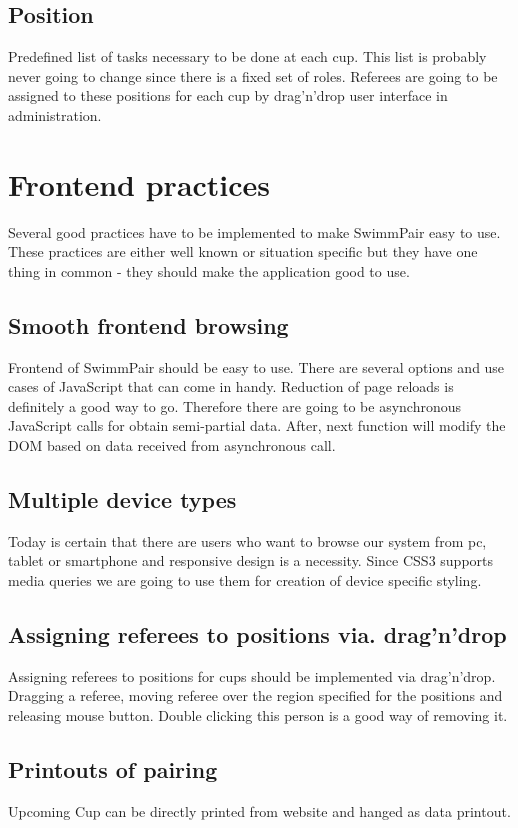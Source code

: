 \subsection*{Position}
Predefined list of tasks necessary to be done at each cup. This list is probably never going to change since there is a fixed set of roles. Referees are going to be assigned to these positions for each cup by drag'n'drop user interface in administration.
\newpage
\section{Frontend practices}
Several good practices have to be implemented to make SwimmPair easy to use. These practices are either well known or situation specific but they have one thing in common - they should make the application good to use.
\subsection*{Smooth frontend browsing}
\par
Frontend of SwimmPair should be easy to use. There are several options and use cases of JavaScript that can come in handy. Reduction of page reloads is definitely a good way to go. Therefore there are going to be asynchronous JavaScript calls for obtain semi-partial data. After, next function will modify the DOM based on data received from asynchronous call. 
\subsection*{Multiple device types}
\par
Today is certain that there are users who want to browse our system from pc, tablet or smartphone and responsive design is a necessity. Since CSS3 supports media queries we are going to use them for creation of device specific styling.
\subsection*{Assigning referees to positions via. drag'n'drop}
\par
Assigning referees to positions for cups should be implemented via drag'n'drop. Dragging a referee, moving referee over the region specified for the positions and releasing mouse button. Double clicking this person is a good way of removing it.
\subsection*{Printouts of pairing}
Upcoming Cup can be directly printed from website and hanged as data printout. 
